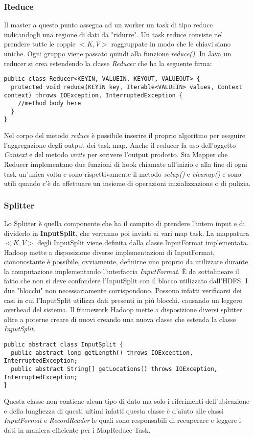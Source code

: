 \subsubsection{Reduce}
Il master a questo punto assegna ad un worker un task di tipo reduce indicandogli una regione di dati da "ridurre". Un task reduce consiste nel prendere tutte le coppie $<K,V>$ raggruppate in modo che le chiavi siano uniche. Ogni gruppo viene passato quindi alla funzione \textit{reduce()}. In Java un reducer si crea estendendo la classe \textit{Reducer} che ha la seguente firma:
\begin{lstlisting}
public class Reducer<KEYIN, VALUEIN, KEYOUT, VALUEOUT> {
  protected void reduce(KEYIN key, Iterable<VALUEIN> values, Context context) throws IOException, InterruptedException {
    //method body here
  }
}
\end{lstlisting}
Nel corpo del metodo \textit{reduce} è possibile inserire il proprio algoritmo per eseguire l'aggregazione degli output dei task map. Anche il reducer fa uso dell'oggetto \textit{Context} e del metodo \textit{write} per scrivere l'output prodotto. Sia Mapper che Reducer implementano due funzioni di hook chiamate all'inizio e alla fine di ogni task un'unica volta e sono rispettivamente il metodo \textit{setup()} e \textit{cleanup()} e sono utili quando c'è da effettuare un insieme di operazioni inizializzazione o di pulizia.
\subsubsection{Splitter}
Lo Splitter è quella componente che ha il compito di prendere l'intero input e di dividerlo in \textbf{InputSplit}, che verranno poi inviati ai vari map task. La mappatura $<K,V>$ degli InputSplit viene definita dalla classe InputFormat implementata. Hadoop mette a disposizione diverse implementazioni di InputFormat, ciononostante è possibile, ovviamente, definirne uno proprio da utilizzare durante la computazione implementando l'interfaccia \textit{InputFormat}. È da sottolineare il fatto che non si deve confondere l'InputSplit con il blocco utilizzato dall'HDFS. I due "blocchi" non necessariamente corrispondono. Possono infatti verificarsi dei casi in cui l'InputSplit utilizza dati presenti in più blocchi, causando un leggero overhead del sistema. Il framework Hadoop mette a disposizione diversi splitter oltre a poterne creare di nuovi creando una nuova classe che estenda la classe \textit{InputSplit}.
\begin{lstlisting}
public abstract class InputSplit {
  public abstract long getLength() throws IOException, InterruptedException;
  public abstract String[] getLocations() throws IOException, InterruptedException;
}
\end{lstlisting}
Questa classe non contiene alcun tipo di dato ma solo i riferimenti dell'ubicazione e della lunghezza di questi ultimi infatti questa classe è d'aiuto alle classi \textit{InputFormat} e \textit{RecordReader} le quali sono responsabili di recuperare e leggere i dati in maniera efficiente per i MapReduce Task.
